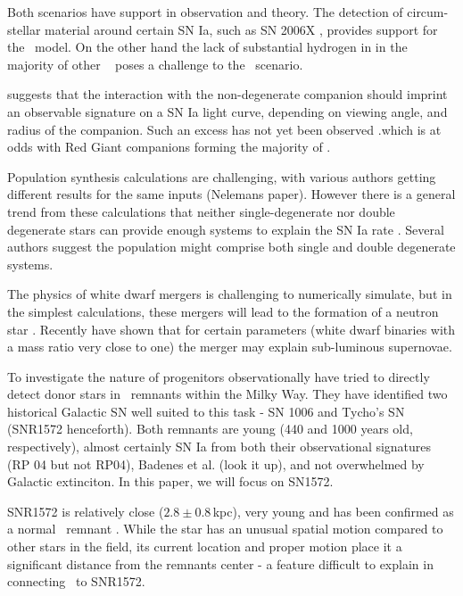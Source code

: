 Both scenarios have support in observation and theory. The detection of circum-stellar material around certain SN Ia, such as SN 2006X \citep{2007Sci...317..924P}, provides support for the \sd\ model. On the other hand the lack of substantial hydrogen in in the majority of other \sneia\ \citep{2007ApJ...670.1275L} poses a challenge to the \sd\ scenario.


\citet{2010ApJ...708.1025K} suggests that the interaction with the non-degenerate companion should imprint an observable signature on a SN Ia  light curve, depending on viewing angle, and radius of the companion. Such an excess has not yet been observed \citep{2010ApJ...722.1691H, 2011Ap&SS.tmp...40T, 2011arXiv1106.4008B}.which is at odds with Red Giant companions forming the majority of \sneia.


Population synthesis calculations are challenging, with various authors getting different results for the same inputs (Nelemans paper). However there is a general trend from these calculations that neither single-degenerate nor double degenerate stars can provide enough systems to explain the SN Ia rate \citep{2009ApJ...699.2026R, 2010A&A...515A..89M,2010A&A...521A..85Y,2008ApJ...677L.109H}. Several authors suggest the population might comprise both single and double degenerate systems.

The physics of white dwarf mergers is challenging to numerically simulate, but in the simplest calculations, these mergers will lead to the formation of a neutron star \citep{1985A&A...150L..21S}. Recently \citet{2010Natur.463...61P} have shown that for certain parameters (white dwarf binaries with a mass ratio very close to one) the merger may explain sub-luminous supernovae. 

To investigate the nature of progenitors observationally \citet[][henceforth \rl]{2004Natur.431.1069R} have tried to directly detect donor stars in \snia\ remnants within the Milky Way. They have identified two historical Galactic SN well suited to this task - SN 1006 and Tycho's SN (SNR1572 henceforth). Both remnants are young (440 and 1000 years old, respectively), almost certainly SN Ia from both their observational signatures (RP 04 but not RP04), Badenes et al. (look it up), and not overwhelmed by Galactic extinciton. In this paper, we will focus on SN1572. 

SNR1572 is relatively close ($2.8\pm0.8$\,kpc), very young and has been confirmed as a normal \snia\ remnant \citep{2006ApJ...645.1373B, 2008Natur.456..617K}.  While the star has an unusual spatial motion compared to other stars in the field, its current location and proper motion place it a significant distance from the remnants center - a feature difficult to explain in connecting \starg\ to SNR1572.

